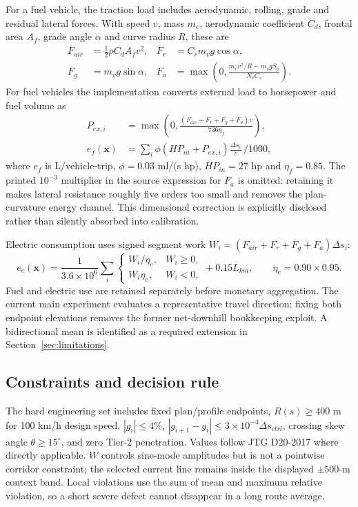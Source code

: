 \documentclass[preprint,12pt]{elsarticle}
\begin{document}
For a fuel vehicle, the traction load includes aerodynamic, rolling, grade and residual lateral forces. With speed $v$, mass $m_v$, aerodynamic coefficient $C_d$, frontal area $A_f$, grade angle $\alpha$ and curve radius $R$, these are
\begin{align}
F_{air}&=\tfrac12\rho C_d A_fv^2, & F_r&=C_rm_vg\cos\alpha,\\
F_g&=m_vg\sin\alpha, &
F_a&=\max\left(0,\frac{m_vv^2/R-m_vgS_p}{N_vC_s}\right).
\end{align}
For fuel vehicles the implementation converts external load to horsepower and fuel volume as
\begin{align}
P_{ex,i}&=\max\left(0,\frac{(F_{air}+F_r+F_g+F_a)v}{736\eta_f}\right),\\
e_f(\bm x)&=\sum_i \phi(HP_{in}+P_{ex,i})\frac{\Delta s_i}{v}\,/1000,
\label{eq:fuel}
\end{align}
where $e_f$ is L/vehicle-trip, $\phi=0.03$ ml/(s hp), $HP_{in}=27$ hp and $\eta_f=0.85$. The printed $10^{-3}$ multiplier in the source expression for $F_a$ is omitted: retaining it makes lateral resistance roughly five orders too small and removes the plan-curvature energy channel. This dimensional correction is explicitly disclosed rather than silently absorbed into calibration.

Electric consumption uses signed segment work $W_i=(F_{air}+F_r+F_g+F_a)\Delta s_i$:
\begin{equation}
e_e(\bm x)=\frac{1}{3.6\times10^6}\sum_i
\begin{cases}W_i/\eta_e,&W_i\geq0,\\W_i\eta_e,&W_i<0,\end{cases}
+0.15L_{km},\qquad \eta_e=0.90\times0.95.
\label{eq:ev}
\end{equation}
Fuel and electric use are retained separately before monetary aggregation. The current main experiment evaluates a representative travel direction; fixing both endpoint elevations removes the former net-downhill bookkeeping exploit. A bidirectional mean is identified as a required extension in Section~\ref{sec:limitations}.

\subsection{Constraints and decision rule}

The hard engineering set includes fixed plan/profile endpoints, $R(s)\geq400$ m for 100 km/h design speed, $|g_i|\leq4\%$, $|g_{i+1}-g_i|\leq3\times10^{-4}\Delta s_{ctrl}$, crossing skew angle $\theta\geq15^\circ$, and zero Tier-2 penetration. Values follow JTG D20-2017 \cite{jtgd20} where directly applicable. $W$ controls sine-mode amplitudes but is not a pointwise corridor constraint; the selected current line remains inside the displayed $\pm500$-m context band. Local violations use the sum of mean and maximum relative violation, so a short severe defect cannot disappear in a long route average.
\end{document}
